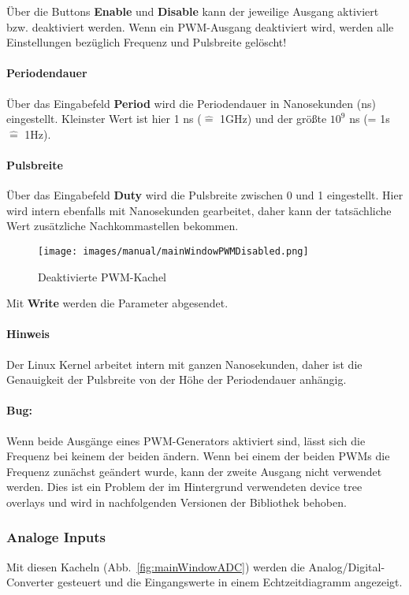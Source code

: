 \documentclass[manual.tex]{subfiles}
\begin{document}
Über die Buttons \textbf{Enable} und \textbf{Disable} kann der jeweilige Ausgang aktiviert bzw. deaktiviert werden. Wenn ein PWM-Ausgang deaktiviert wird, werden alle Einstellungen bezüglich Frequenz und Pulsbreite gelöscht!

\paragraph{Periodendauer} Über das Eingabefeld \textbf{Period} wird die Periodendauer in Nanosekunden (ns) eingestellt. Kleinster Wert ist hier 1 ns ($\hat{=}$ 1GHz) und der größte $10^9$ ns (= 1s $\hat{=}$ 1Hz).

\paragraph{Pulsbreite} Über das Eingabefeld \textbf{Duty} wird die Pulsbreite zwischen 0 und 1 eingestellt. Hier wird intern ebenfalls mit Nanosekunden gearbeitet, daher kann der tatsächliche Wert zusätzliche Nachkommastellen bekommen.

\begin{figure}[ht] 
	\centering
	\texttt{[image: images/manual/mainWindowPWMDisabled.png]}
	\caption{Deaktivierte PWM-Kachel}
	\label{fig:mainWindowPWMDisabled}
\end{figure}

Mit \textbf{Write} werden die Parameter abgesendet.

\paragraph{Hinweis} Der Linux Kernel arbeitet intern mit ganzen Nanosekunden, daher ist die Genauigkeit der Pulsbreite von der Höhe der Periodendauer anhängig.

\paragraph{Bug:} Wenn beide Ausgänge eines PWM-Generators aktiviert sind, lässt sich die Frequenz bei keinem der beiden ändern. Wenn bei einem der beiden PWMs die Frequenz zunächst geändert wurde, kann der zweite Ausgang nicht verwendet werden. Dies ist ein Problem der im Hintergrund verwendeten device tree overlays und wird in nachfolgenden Versionen der Bibliothek behoben.


\subsubsection{Analoge Inputs}
Mit diesen Kacheln \mbox{(Abb. \ref{fig:mainWindowADC})} werden die Analog/Digital-Converter gesteuert und die Eingangswerte in einem Echtzeitdiagramm angezeigt.\\
\end{document}
